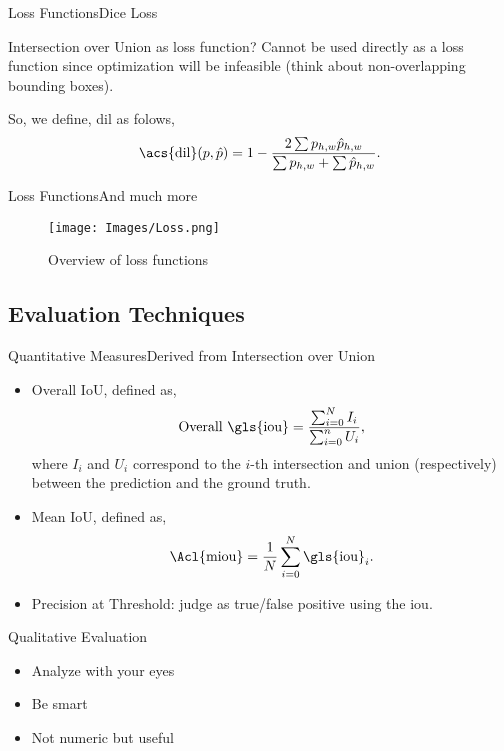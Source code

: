 \documentclass{beamer}
\begin{document}
\begin{frame}{Loss Functions}{Dice Loss}
  \begin{alertblock}{Intersection over Union as loss function?}
    Cannot be used directly as a loss function since optimization will be
    \alert{infeasible} (think about non-overlapping bounding boxes).
  \end{alertblock}
  So, we define, \acf{dil} as folows,
  \begin{equation}
    \text{\acs{dil}}(p, \hat{p}) = 1 -
    \frac{2\sum p_{h, w}\hat{p}_{h, w}}{\sum p_{h, w} + \sum \hat{p}_{h, w}}.
  \end{equation}
\end{frame}

\begin{frame}{Loss Functions}{And much more}
  \begin{figure}
    \texttt{[image: Images/Loss.png]}
    \caption{Overview of loss functions}
  \end{figure}
\end{frame}


\subsection{Evaluation Techniques}

\begin{frame}{Quantitative Measures}{Derived from Intersection over Union}
  \vspace*{-.5cm}
  \begin{itemize}
    \item Overall IoU, defined as,
    \begin{equation}
      \text{Overall \gls{iou}} =
      \frac{\sum_{i=0}^N I_i}{\sum_{i=0}^n U_i},
    \end{equation}
    where \(I_i\) and \(U_i\) correspond to the \(i\)-th intersection and union
    (respectively) between the prediction and the ground truth.
    \item Mean IoU, defined as,
    \begin{equation}
      \text{\Acl{miou}} = \frac{1}{N}\sum_{i=0}^N \text{\gls{iou}}_i.
    \end{equation}
    \item Precision at Threshold: judge as true/false positive using the
    \gls{iou}.
  \end{itemize}
\end{frame}

\begin{frame}{Qualitative Evaluation}
  \begin{itemize}
    \item Analyze with your eyes
    \item Be smart
    \item Not numeric but useful
  \end{itemize}
\end{frame}
\end{document}
